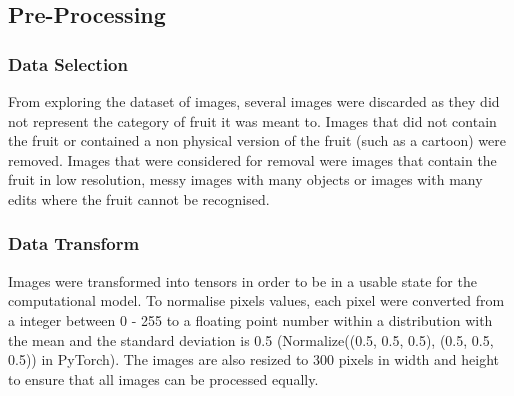 \documentclass[../main.tex]{subfiles}
\begin{document}
\subsection{Pre-Processing}

\subsubsection{Data Selection}

From exploring the dataset of images, several images were discarded as they did not represent the category of fruit it was meant to. Images that did not contain the fruit or contained a non physical version of the fruit (such as a cartoon) were removed. Images that were considered for removal were images that contain the fruit in low resolution, messy images with many objects or images with many edits where the fruit cannot be recognised.

\subsubsection{Data Transform}

Images were transformed into tensors in order to be in a usable state for the computational model. To normalise pixels values, each pixel were converted from a integer between 0 - 255 to a floating point number within a distribution with the mean and the standard deviation is 0.5 (Normalize((0.5, 0.5, 0.5), (0.5, 0.5, 0.5)) in PyTorch). The images are also resized to 300 pixels in width and height to ensure that all images can be processed equally.
\end{document}
